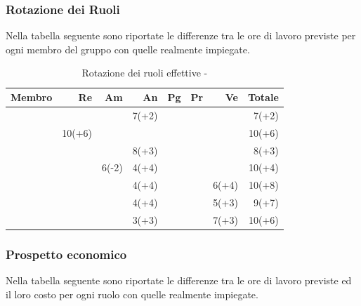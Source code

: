 \documentclass[12pt,a4paper]{article}
\begin{document}
\subsubsection{Rotazione dei Ruoli}
Nella tabella seguente sono riportate le differenze tra le ore di lavoro previste per ogni membro del gruppo con quelle realmente impiegate.

\begin{table}[H]
	\begin{center}
		\begin{tabular}{l r r r r r r r}
			\toprule
			\textbf{Membro}	&	\textbf{Re}	&	\textbf{Am}	& \textbf{An} & \textbf{Pg} & \textbf{Pr} & \textbf{Ve} & \textbf{Totale}\\
			\midrule
			\midrule
            \IB{} & & & 7(+2) & & & & 7(+2) \\
			\midrule
            \AB{} & 10(+6) & & & & & & 10(+6) \\
			\midrule
            \NDC{} & & & 8(+3) & & & & 8(+3) \\
			\midrule
            \TP{} & & 6(-2) & 4(+4) & & & & 10(+4) \\
			\midrule
            \WS{} & & & 4(+4) & & & 6(+4) & 10(+8) \\
			\midrule
            \AVE{} & & & 4(+4) & & & 5(+3)& 9(+7) \\
			\midrule
            \AVI{} & & & 3(+3) & & & 7(+3) & 10(+6) \\
			\bottomrule
		\end{tabular}
		\caption{Rotazione dei ruoli effettive - \FAD{}}
	\end{center}
\end{table}

\subsubsection{Prospetto economico}
Nella tabella seguente sono riportate le differenze tra le ore di lavoro previste ed il loro costo per ogni ruolo con quelle realmente impiegate.
\end{document}
